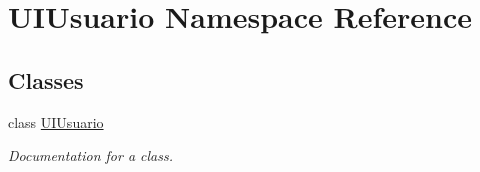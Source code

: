 \hypertarget{namespace_u_i_usuario}{}\section{U\+I\+Usuario Namespace Reference}
\label{namespace_u_i_usuario}
\subsection*{Classes}
\begin{DoxyCompactItemize}
\item 
class \mbox{\hyperlink{class_u_i_usuario_1_1_u_i_usuario}{U\+I\+Usuario}}
\begin{DoxyCompactList}\small\item\em Documentation for a class. \end{DoxyCompactList}\end{DoxyCompactItemize}
